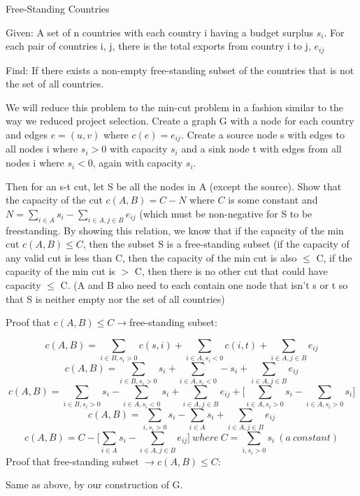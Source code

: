 \documentclass[11pt, oneside]{article}
\newenvironment{Question}[1]
  {\renewcommand\theinnerQuestion{#1}\innerQuestion}
  {\endinnerQuestion}
\begin{document}
\begin{Question}{7.45} Free-Standing Countries\par
\smallskip

\noindent Given: A set of n countries with each country i having a budget surplus $s_i$. For each pair of countries i, j, there is the total exports from country i to j, $e_{ij}$\par
\smallskip
\noindent Find: If there exists a non-empty free-standing subset of the countries that is not the set of all countries.\par
\bigskip
We will reduce this problem to the min-cut problem in a fashion similar to the way we reduced project selection. Create a graph G with a node for each country and edges $e=(u,v)$ where $c(e)=e_{ij}$. Create a source node s with edges to all nodes i where $s_i>0$ with capacity $s_i$ and a sink node t with edges from all nodes i where $s_i<0$, again with capacity $s_i$. \par
\bigskip
Then for an s-t cut, let S be all the nodes in A (except the source). Show that the capacity of the cut $c(A,B)=C-N$ where $C$ is some constant and $N=\sum\limits_{i \in A}^{}s_i-\sum\limits_{i \in A, j \in B}^{} e_{ij}$ (which must be non-negative for S to be freestanding. By showing this relation, we know that if the capacity of the min cut $c(A,B)\leq C$, then the subset S is a free-standing subset (if the capacity of any valid cut is less than C, then the capacity of the min cut is also $\leq$ C, if the capacity of the min cut is $>$ C, then there is no other cut that could have capacity $\leq$ C. (A and B also need to each contain one node that isn't s or t so that S is neither empty nor the set of all countries)\par
\bigskip
\noindent Proof that $c(A,B)\leq C \rightarrow $free-standing subset:\par
$$c(A,B)=\sum_{i \in B, s_i>0}c(s,i)+\sum_{i \in A, s_i<0}c(i,t)+\sum_{i \in A, j \in B}e_{ij}$$
$$c(A,B)=\sum_{i \in B, s_i>0}s_i+\sum_{i \in A, s_i<0}-s_i+\sum_{i \in A, j \in B}e_{ij}$$
$$c(A,B)=\sum_{i \in B, s_i>0}s_i-\sum_{i \in A, s_i<0}s_i+\sum_{i \in A, j \in B}e_{ij} + \Big[\sum_{i \in A, s_i > 0}s_i-\sum_{i \in A, s_i > 0}s_i\Big]$$
$$c(A,B)=\sum_{i, s_i>0}s_i-\sum_{i \in A}s_i+\sum_{i \in A, j \in B}e_{ij}$$
$$c(A,B)=C-\Big[\sum_{i \in A}s_i-\sum_{i \in A, j \in B}e_{ij}\Big]\ where\ C=\sum_{i, s_i>0}s_i\ (a\ constant)$$
\bigskip
\noindent Proof that free-standing subset $\rightarrow c(A,B)\leq C$: \par
Same as above, by our construction of G.

\end{Question}
\end{document}
